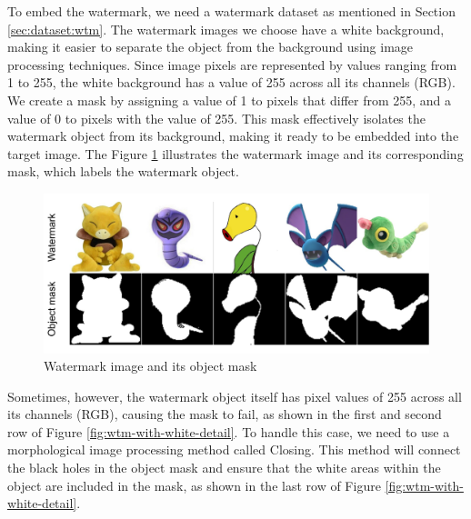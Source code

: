 To embed the watermark, we need a watermark dataset as mentioned in Section \ref{sec:dataset:wtm}. The watermark images we choose have a white background, making it easier to separate the object from the background using image processing techniques. Since image pixels are represented by values ranging from 1 to 255, the white background has a value of 255 across all its channels (RGB). We create a mask by assigning a value of 1 to pixels that differ from 255, and a value of 0 to pixels with the value of 255. This mask effectively isolates the watermark object from its background, making it ready to be embedded into the target image. The Figure \ref{fig:wtm-obj-mask-1} illustrates the watermark image and its corresponding mask, which labels the watermark object.

\begin{figure}[t]
    \centering
    \includegraphics[width=0.8\linewidth]{img/watermark-and-objectmask.png}
    \caption{Watermark image and its object mask}
    \label{fig:wtm-obj-mask-1}
\end{figure}

Sometimes, however, the watermark object itself has pixel values of 255 across all its channels (RGB), causing the mask to fail, as shown in the first and second row of Figure \ref{fig:wtm-with-white-detail}. To handle this case, we need to use a morphological image processing method called Closing. This method will connect the black holes in the object mask and ensure that the white areas within the object are included in the mask, as shown in the last row of Figure \ref{fig:wtm-with-white-detail}.

